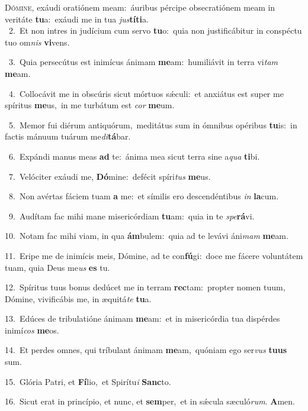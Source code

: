\lettrine{\initial\textcolor{\initialcolor}{D}}{ómine,} exáudi oratiónem meam:~\dagger áuribus pércipe obsecratiónem meam in veritáte \textbf{tu}\-a:~\star exáudi me in tua \textit{jus}\-\textbf{tí}\textbf{ti}a.\\
{\numbfont\textcolor{\numbcolor}{~2.}}~Et non intres in judícium cum servo \textbf{tu}\-o:~\star quia non justificábitur in conspéctu tuo om\textit{nis} \textbf{vi}\-vens.\par
{\numbfont\textcolor{\numbcolor}{~3.}}~Quia persecútus est inimícus ánimam \textbf{me}\-am:~\star humiliávit in terra vi\textit{tam} \textbf{me}\-am.\par
{\numbfont\textcolor{\numbcolor}{~4.}}~Collocávit me in obscúris sicut mórtuos sǽculi:~\dagger et anxiátus est super me spíritus \textbf{me}\-us,~\star in me turbátum est \textit{cor} \textbf{me}\-um.\par
{\numbfont\textcolor{\numbcolor}{~5.}}~Memor fui diérum antiquórum,~\dagger meditátus sum in ómnibus opéribus \textbf{tu}\-is:~\star in factis mánuum tuárum me\-\textit{di}\-\textbf{tá}bar.\par
{\numbfont\textcolor{\numbcolor}{~6.}}~Expándi manus meas \textbf{ad} te:~\star ánima mea sicut terra sine a\textit{qua} \textbf{ti}\-bi.\par
{\numbfont\textcolor{\numbcolor}{~7.}}~Velóciter exáudi me, \textbf{Dó}\-mine:~\star defécit spíri\textit{tus} \textbf{me}\-us.\par
{\numbfont\textcolor{\numbcolor}{~8.}}~Non avértas fáciem tuam \textbf{a} me:~\star et símilis ero descendéntibus \textit{in} \textbf{la}\-cum.\par
{\numbfont\textcolor{\numbcolor}{~9.}}~Audítam fac mihi mane misericórdiam \textbf{tu}\-am:~\star quia in te \textit{spe}\-\textbf{rá}vi.\par
{\numbfont\textcolor{\numbcolor}{10.}}~Notam fac mihi viam, in qua \textbf{ám}\-bulem:~\star quia ad te levávi áni\textit{mam} \textbf{me}\-am.\par
{\numbfont\textcolor{\numbcolor}{11.}}~Eripe me de inimícis meis, Dómine, ad te con\-\textbf{fú}\-gi:~\star doce me fácere voluntátem tuam, quia Deus me\textit{us} \textbf{es} tu.\par
{\numbfont\textcolor{\numbcolor}{12.}}~Spíritus tuus bonus dedúcet me in terram \textbf{rec}\-tam:~\star propter nomen tuum, Dómine, vivificábis me, in æquitá\textit{te} \textbf{tu}\-a.\par
{\numbfont\textcolor{\numbcolor}{13.}}~Edúces de tribulatióne ánimam \textbf{me}\-am:~\star et in misericórdia tua dispérdes inimí\textit{cos} \textbf{me}\-os.\par
{\numbfont\textcolor{\numbcolor}{14.}}~Et perdes omnes, qui tríbulant ánimam \textbf{me}\-am,~\star quóniam ego ser\textit{vus} \textbf{tu}\-\textbf{us} sum.\par
{\numbfont\textcolor{\numbcolor}{15.}}~Glória Patri, et \textbf{Fí}\-lio,~\star et Spirítu\textit{i} \textbf{Sanc}\-to.\par
{\numbfont\textcolor{\numbcolor}{16.}}~Sicut erat in princípio, et nunc, et \textbf{sem}\-per,~\star et in sǽcula sæculó\-\textit{rum}\-. \textbf{A}\-men.\par
